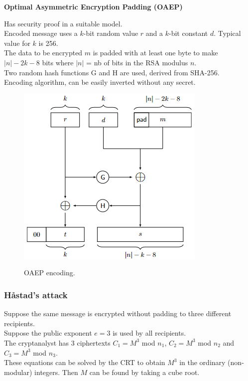 \documentclass{article}
\begin{document}
\textbf{Optimal Asymmetric Encryption Padding (OAEP)}

Has security proof in a suitable model.\\
Encoded message uses a $k$-bit random value $r$ and a $k$-bit constant $d$. Typical value for $k$ is 256.\\
The data to be encrypted $m$ is padded with at least one byte to make $\vert n \vert - 2k-8$ bits where $\vert n \vert$ = nb of bits in the RSA modulus $n$.\\
Two random hash functions G and H are used, derived from SHA-256.\\
Encoding algorithm, can be easily inverted without any secret.

\begin{figure}[H]
\centering
\includegraphics[scale=0.7]{Images/oaepencoding.png}
\label{fig:fround}
\caption{OAEP encoding.}
\end{figure}

\subsubsection{Håstad's attack}\label{Håstad's attack}

Suppose the same message is encrypted without padding to three different recipients.\\
Suppose the public exponent $e=3$ is used by all recipients.\\
The cryptanalyst has 3 ciphertexts $C_1 = M^3$ mod $n_1$, $C_2 = M^3$ mod $n_2$ and $C_3 = M^3$ mod $n_3$.\\
These equations can be solved by the CRT to obtain $M^3$ in the ordinary (non-modular) integers. Then $M$ can be found by taking a cube root.
\end{document}
